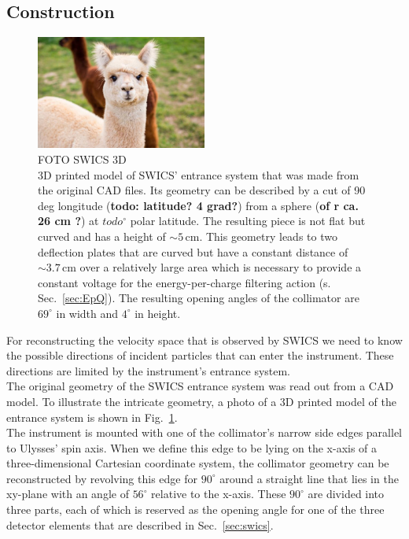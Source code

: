 \subsection{Construction} 
\label{subsec:construction}
\begin{figure}[h]
	\includegraphics[width=0.5\textwidth]{Figures/dummy.jpg}
	\centering
	\caption{FOTO SWICS 3D \\ 3D printed model of SWICS' entrance system that was made from the original CAD files. Its geometry can be described by a cut of 90 deg longitude (\textbf{todo: latitude? 4 grad?}) from a sphere (\textbf{of r ca. 26 cm ?}) at $todo ^\circ$ polar latitude. The resulting piece is not flat but curved and has a height of $\sim 5\,\mathrm{cm}$. This geometry leads to two deflection plates that are curved but have a constant distance of $\sim 3.7\,\mathrm{cm}$ over a relatively large area which is necessary to provide a constant voltage for the energy-per-charge filtering action (s. Sec.~\ref{sec:EpQ}). The resulting opening angles of the collimator are $69^\circ$ in width and $4^\circ$ in height.}
	\label{fig:3dcol}
\end{figure}
For reconstructing the velocity space that is observed by SWICS we need to know the possible directions of incident particles that can enter the instrument. These directions are limited by the instrument's entrance system.
\\
The original geometry of the SWICS entrance system was read out from a CAD model. To illustrate the intricate geometry, a photo of a 3D printed model of the entrance system is shown in Fig.~\ref{fig:3dcol}.\\
The instrument is mounted with one of the collimator's narrow side edges parallel to Ulysses' spin axis. When we define this edge to be lying on the x-axis of a three-dimensional Cartesian coordinate system, the collimator geometry can be reconstructed by revolving this edge for $90^\circ$ around a straight line that lies in the xy-plane with an angle of $56^\circ$ relative to the x-axis.  These $90^\circ$ are divided into three parts, each of which is reserved as the opening angle for one of the three detector elements that are described in Sec.~\ref{sec:swics}. \\ \\
